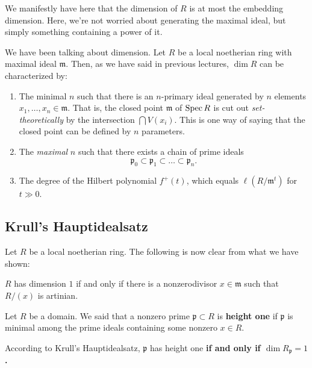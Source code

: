 \begin{remark} 
We manifestly have here that the dimension of $R$ is at most the embedding
dimension. Here, we're not worried about generating the maximal ideal, but
simply something containing a power of it.
\end{remark} 

We have been talking about dimension. Let $R$ be a local noetherian ring with
maximal ideal $\mathfrak{m}$. Then, as we have said in previous lectures, $\dim R$ can be characterized by:
\begin{enumerate}
\item The minimal $n$ such that there is an $n$-primary ideal generated by $n$
elements $x_1, \dots, x_n \in \mathfrak{m}$. That is, the closed point
$\mathfrak{m}$ of
$\operatorname{Spec} R$ is cut out \emph{set-theoretically} by the intersection $\bigcap
V(x_i)$. This is one way of saying that the closed point can be defined by $n$
parameters. 
\item The \emph{maximal} $n$ such that there exists a chain of prime ideals
\[ \mathfrak{p}_0 \subset \mathfrak{p}_1 \subset \dots \subset \mathfrak{p}_n. \]
\item The degree of the Hilbert polynomial $f^+(t)$, which equals
$\ell(R/\mathfrak{m}^t)$ for $t \gg 0$.
\end{enumerate}


\subsection{Krull's Hauptidealsatz}


Let $R$ be a local noetherian ring.
The following is now clear from what we have shown:

\begin{theorem}
$R$ has dimension $1$ if and only if there is a nonzerodivisor $x \in \mathfrak{m}$ such that
$R/(x)$ is artinian.
\end{theorem} 



\begin{remark} 
Let $R$ be a domain. We said that a nonzero prime $\mathfrak{p} \subset R$ is
\textbf{height one} if $\mathfrak{p}$ is minimal among the prime ideals
containing some nonzero $x \in R$. 

According to Krull's Hauptidealsatz, $\mathfrak{p}$ has height one \textbf{if
and only if $\dim R_{\mathfrak{p}} = 1$.}
\end{remark} 


